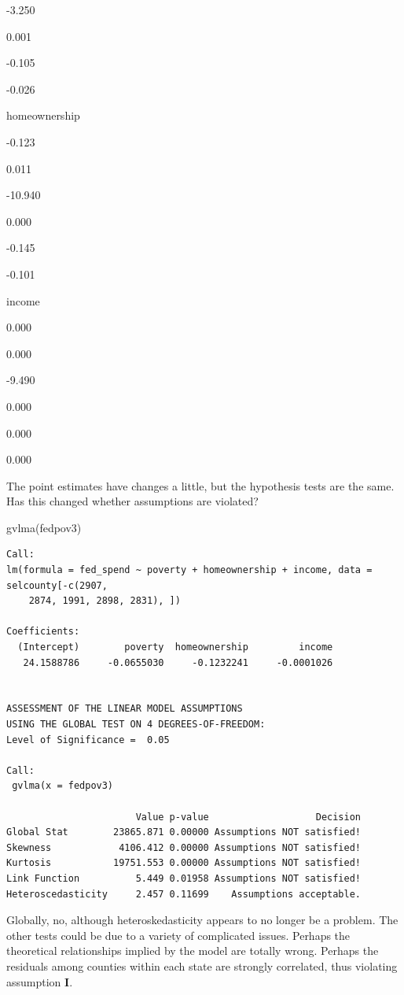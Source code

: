 \documentclass[
]{book}
\makeatletter
\newenvironment{Shaded}{\begin{snugshade}}{\end{snugshade}}
\newcommand{\FunctionTok}[1]{\textcolor[rgb]{0,0,0}{#1}}
\newcommand{\NormalTok}[1]{#1}
\newenvironment{kframe}{%
\medskip{}
\setlength{\fboxsep}{.8em}
 \def\at@end@of@kframe{}%
 \ifinner\ifhmode%
  \def\at@end@of@kframe{\end{minipage}}%
  \begin{minipage}{\columnwidth}%
 \fi\fi%
 \def\FrameCommand##1{\hskip\@totalleftmargin \hskip-\fboxsep
 \colorbox{shadecolor}{##1}\hskip-\fboxsep
     \hskip-\linewidth \hskip-\@totalleftmargin \hskip\columnwidth}%
 \MakeFramed {\advance\hsize-\width
   \@totalleftmargin\z@ \linewidth\hsize
   \@setminipage}}%
 {\par\unskip\endMakeFramed%
 \at@end@of@kframe}
\renewenvironment{Shaded}{\begin{kframe}}{\end{kframe}}
\makeatother
\begin{document}
-3.250

0.001

-0.105

-0.026

homeownership

-0.123

0.011

-10.940

0.000

-0.145

-0.101

income

0.000

0.000

-9.490

0.000

0.000

0.000

The point estimates have changes a little, but the hypothesis tests are the same. Has this changed whether assumptions are violated?

\begin{Shaded}
\begin{Highlighting}[]
\FunctionTok{gvlma}\NormalTok{(fedpov3)}
\end{Highlighting}
\end{Shaded}

\begin{verbatim}
Call:
lm(formula = fed_spend ~ poverty + homeownership + income, data = selcounty[-c(2907, 
    2874, 1991, 2898, 2831), ])

Coefficients:
  (Intercept)        poverty  homeownership         income  
   24.1588786     -0.0655030     -0.1232241     -0.0001026  


ASSESSMENT OF THE LINEAR MODEL ASSUMPTIONS
USING THE GLOBAL TEST ON 4 DEGREES-OF-FREEDOM:
Level of Significance =  0.05 

Call:
 gvlma(x = fedpov3) 

                       Value p-value                   Decision
Global Stat        23865.871 0.00000 Assumptions NOT satisfied!
Skewness            4106.412 0.00000 Assumptions NOT satisfied!
Kurtosis           19751.553 0.00000 Assumptions NOT satisfied!
Link Function          5.449 0.01958 Assumptions NOT satisfied!
Heteroscedasticity     2.457 0.11699    Assumptions acceptable.
\end{verbatim}

Globally, no, although heteroskedasticity appears to no longer be a problem. The other tests could be due to a variety of complicated issues. Perhaps the theoretical relationships implied by the model are totally wrong. Perhaps the residuals among counties within each state are strongly correlated, thus violating assumption \textbf{I}.
\end{document}
